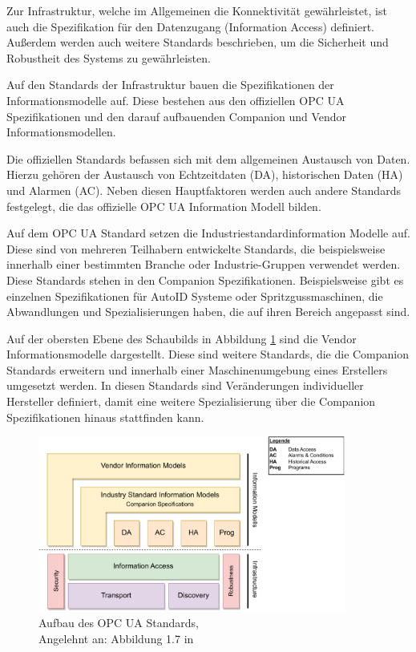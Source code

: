 \documentclass[a4paper, 12pt, oneside]{scrbook}
\begin{document}
		Zur Infrastruktur, welche im Allgemeinen die Konnektivität gewährleistet, ist auch die Spezifikation für den Datenzugang (Information Access) definiert. Außerdem werden auch weitere Standards beschrieben, um die Sicherheit und Robustheit des Systems zu gewährleisten.
		
		Auf den Standards der Infrastruktur bauen die Spezifikationen der Informationsmodelle auf. Diese bestehen aus den offiziellen OPC UA Spezifikationen und den darauf aufbauenden Companion und Vendor Informationsmodellen. \cite{mahnke_opc_2009}
		
		Die offiziellen Standards befassen sich mit dem allgemeinen Austausch von Daten. Hierzu gehören der Austausch von Echtzeitdaten (DA), historischen Daten (HA) und Alarmen (AC). Neben diesen Hauptfaktoren werden auch andere Standards festgelegt, die das offizielle OPC UA Information Modell bilden. \cite{mahnke_opc_2009, rinke_was_2022}
		
		Auf dem OPC UA Standard setzen die Industriestandardinformation Modelle auf. Diese sind von mehreren Teilhabern entwickelte Standards, die beispielsweise innerhalb einer bestimmten Branche oder Industrie-Gruppen verwendet werden. Diese Standards stehen in den Companion Spezifikationen. Beispielsweise gibt es einzelnen Spezifikationen für AutoID Systeme oder Spritzgussmaschinen, die Abwandlungen und Spezialisierungen haben, die auf ihren Bereich angepasst sind. \cite{mahnke_opc_2009, rinke_was_2022}
		
		Auf der obersten Ebene des Schaubilds in Abbildung \ref{fig:OPCUA_Framework} sind die Vendor Informationsmodelle dargestellt. Diese sind weitere Standards, die die Companion Standards erweitern und innerhalb einer Maschinenumgebung eines Erstellers umgesetzt werden. In diesen Standards sind Veränderungen individueller Hersteller definiert, damit eine weitere Spezialisierung über die Companion Spezifikationen hinaus stattfinden kann. \cite{mahnke_opc_2009, rinke_was_2022}
		
		
		\begin{figure}[H]
			\centering
			\includegraphics[width=0.9\textwidth]{res/diagramms/companionSpezifikations.pdf}
			\caption{Aufbau des OPC UA Standards, \\ Angelehnt an: Abbildung 1.7 in \cite{mahnke_opc_2009}} %
			\label{fig:OPCUA_Framework}
		\end{figure}
	
\end{document}
